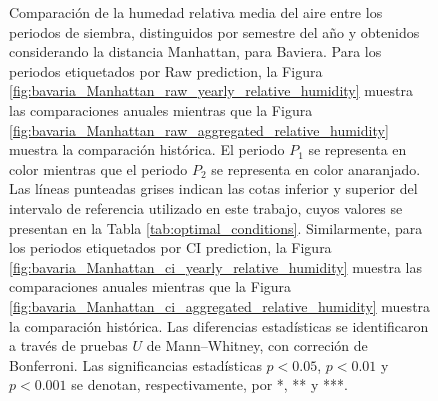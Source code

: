 \begin{figure}[htbp]
	\caption{Comparación de la humedad relativa media del aire entre los periodos de siembra, distinguidos por semestre del año y obtenidos considerando la distancia Manhattan, para Baviera. Para los periodos etiquetados por Raw prediction, la Figura \ref{fig:bavaria_Manhattan_raw_yearly_relative_humidity} muestra las comparaciones anuales mientras que la Figura \ref{fig:bavaria_Manhattan_raw_aggregated_relative_humidity} muestra la comparación histórica. El periodo $P_1$ se representa en color mientras que el periodo $P_2$ se representa en color anaranjado. Las líneas punteadas grises indican las cotas inferior y superior del intervalo de referencia utilizado en este trabajo, cuyos valores se presentan en la Tabla \ref{tab:optimal_conditions}. Similarmente, para los periodos etiquetados por CI prediction, la Figura \ref{fig:bavaria_Manhattan_ci_yearly_relative_humidity} muestra las comparaciones anuales mientras que la Figura \ref{fig:bavaria_Manhattan_ci_aggregated_relative_humidity} muestra la comparación histórica. Las diferencias estadísticas se identificaron a través de pruebas $U$ de Mann--Whitney, con correción de Bonferroni. Las significancias estadísticas $p<0.05$, $p<0.01$ y $p<0.001$ se denotan, respectivamente, por *, ** y ***.
	}
	\label{fig:bavaria_Manhattan_relative_humidity}
	
	
\end{figure}





